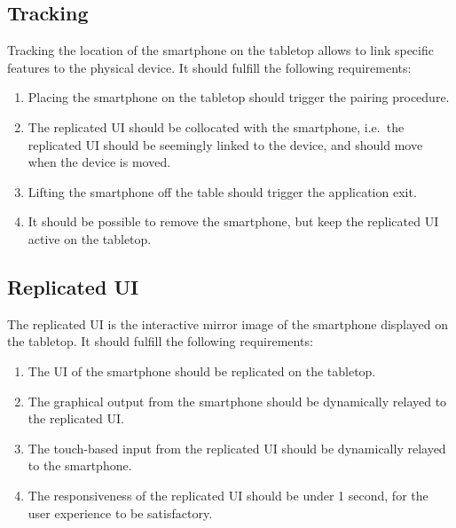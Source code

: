 \subsection{Tracking}

Tracking the location of the smartphone on the tabletop allows to link specific features to the physical device.
It should fulfill the following requirements:

\label{RB}
\begin{enumerate}[{RB}-1]
\item Placing the smartphone on the tabletop should trigger the pairing procedure.
\item The replicated UI should be collocated with the smartphone, i.e.\ the replicated UI should be seemingly linked to the device, and should move when the device is moved.
\item Lifting the smartphone off the table should trigger the application exit.
\item It should be possible to remove the smartphone, but keep the replicated UI active on the tabletop.
\end{enumerate}


\subsection{Replicated UI}

The replicated UI is the interactive mirror image of the smartphone displayed on the tabletop.
It should fulfill the following requirements:

\label{RC}
\begin{enumerate}[{RC}-1]
\item The UI of the smartphone should be replicated on the tabletop.
\item The graphical output from the smartphone should be dynamically relayed to the replicated UI.
\item The touch-based input from the replicated UI should be dynamically relayed to the smartphone.
\item The responsiveness of the replicated UI should be under 1 second, for the user experience to be satisfactory.
\end{enumerate}

